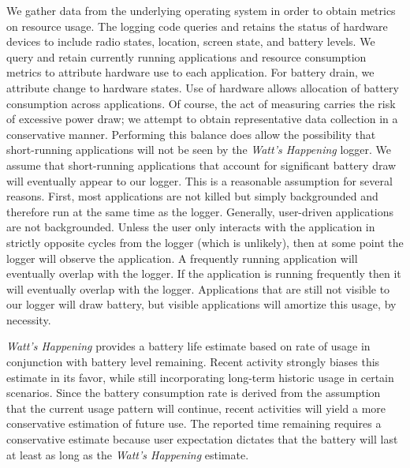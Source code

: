 We gather data from the underlying operating system in order to obtain metrics on resource usage.
The logging code queries and retains the status of hardware devices to include radio states, location, screen state, and battery levels.
We query and retain currently running applications and resource consumption metrics to attribute hardware use to each application.
For battery drain, we attribute change to hardware states.
Use of hardware allows allocation of battery consumption across applications.
Of course, the act of measuring carries the risk of excessive power draw; we attempt to obtain representative data collection in a conservative manner.
Performing this balance does allow the possibility that short-running applications will not be seen by the \emph{Watt's Happening} logger.
We assume that short-running applications that account for significant battery draw will eventually appear to our logger.
This is a reasonable assumption for several reasons.
First, most applications are not killed but simply backgrounded and therefore run at the same time as the logger.
Generally, user-driven applications are not backgrounded.
Unless the user only interacts with the application in strictly opposite cycles from the logger (which is unlikely), then at some point the logger will observe the application.
A frequently running application will eventually overlap with the logger.
If the application is running frequently then it will eventually overlap with the logger.
Applications that are still not visible to our logger will draw battery, but visible applications will amortize this usage, by necessity.

\emph{Watt's Happening} provides a battery life estimate based on rate of usage in conjunction with battery level remaining.
Recent activity strongly biases this estimate in its favor, while still incorporating long-term historic usage in certain scenarios.
Since the battery consumption rate is derived from the assumption that the current usage pattern will continue, recent activities will yield a more conservative estimation of future use.
The reported time remaining requires a conservative estimate because user expectation dictates that the battery will last at least as long as the \emph{Watt's Happening} estimate.

